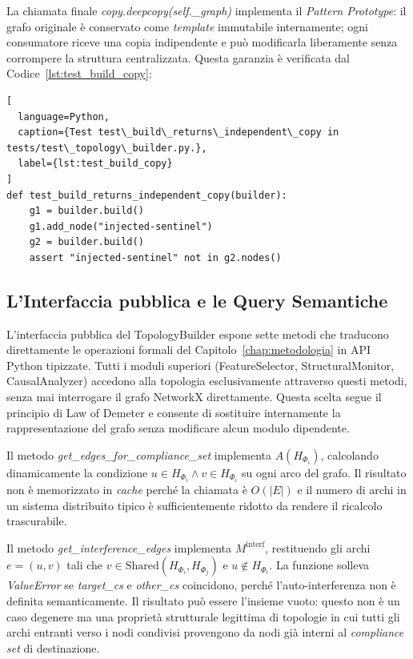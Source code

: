 La chiamata finale \textit{copy.deepcopy(self.\_graph)} implementa il \textit{Pattern Prototype}: il
grafo originale è conservato come \textit{template} immutabile internamente; ogni consumatore
riceve una copia indipendente e può modificarla liberamente senza corrompere la struttura
centralizzata. Questa garanzia è verificata dal Codice~\ref{lst:test_build_copy}:

\begin{lstlisting}[
  language=Python,
  caption={Test test\_build\_returns\_independent\_copy in tests/test\_topology\_builder.py.},
  label={lst:test_build_copy}
]
def test_build_returns_independent_copy(builder):
    g1 = builder.build()
    g1.add_node("injected-sentinel")
    g2 = builder.build()
    assert "injected-sentinel" not in g2.nodes()
\end{lstlisting}

\subsection{L'Interfaccia pubblica e le Query Semantiche}
\label{subsec:topology_queries}

L'interfaccia pubblica del TopologyBuilder espone sette metodi che traducono direttamente le
operazioni formali del Capitolo~\ref{chap:metodologia} in API Python tipizzate. Tutti i moduli
superiori (FeatureSelector, StructuralMonitor, CausalAnalyzer) accedono alla topologia
esclusivamente attraverso questi metodi, senza mai interrogare il grafo NetworkX direttamente.
Questa scelta segue il principio di Law of Demeter e consente di sostituire internamente la
rappresentazione del grafo senza modificare alcun modulo dipendente.

Il metodo \textit{get\_edges\_for\_compliance\_set} implementa $A(H_{\Phi_i})$, calcolando
dinamicamente la condizione $u \in H_{\Phi_i} \wedge v \in H_{\Phi_i}$ su ogni arco del grafo.
Il risultato non è memorizzato in \textit{cache} perché la chiamata è $O(|E|)$ e il numero
di archi in un sistema distribuito tipico è sufficientemente ridotto da rendere il ricalcolo
trascurabile.

Il metodo \textit{get\_interference\_edges} implementa $M^{\text{interf}}$, restituendo gli
archi $e = (u, v)$ tali che $v \in \text{Shared}(H_{\Phi_i}, H_{\Phi_j})$ e
$u \notin H_{\Phi_i}$. La funzione solleva \textit{ValueError} se \textit{target\_cs} e
\textit{other\_cs} coincidono, perché l'auto-interferenza non è definita semanticamente. Il
risultato può essere l'insieme vuoto: questo non è un caso degenere ma una proprietà strutturale
legittima di topologie in cui tutti gli archi entranti verso i nodi condivisi provengono da nodi
già interni al \textit{compliance set} di destinazione.

